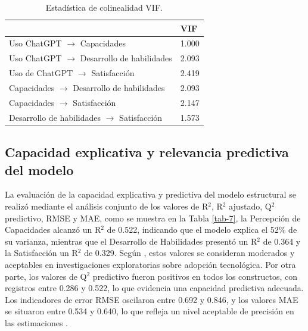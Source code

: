 \documentclass[spanish]{textolivre}
\begin{document}
\begin{table}[h!]
\centering
\begin{threeparttable}
\caption{Estadística de colinealidad VIF.}\label{tab-6}
\begin{tabular}{l l}
\toprule
 & VIF \\
\midrule
Uso ChatGPT $\rightarrow$ Capacidades & 1.000 \\
Uso ChatGPT $\rightarrow$ Desarrollo de habilidades & 2.093 \\
Uso de ChatGPT $\rightarrow$ Satisfacción & 2.419 \\
Capacidades $\rightarrow$ Desarrollo de habilidades & 2.093 \\
Capacidades $\rightarrow$ Satisfacción & 2.147 \\
Desarrollo de habilidades $\rightarrow$ Satisfacción & 1.573 \\
\bottomrule
\end{tabular}
\end{threeparttable}
\end{table}

\subsection{Capacidad explicativa y relevancia predictiva del modelo}
La evaluación de la capacidad explicativa y predictiva del modelo estructural se realizó mediante el análisis conjunto de los valores de R$^2$, R$^2$ ajustado, Q$^2$ predictivo, RMSE y MAE, como se muestra en la Tabla \ref{tab-7}, la Percepción de Capacidades alcanzó un R$^2$ de 0.522, indicando que el modelo explica el 52\% de su varianza, mientras que el Desarrollo de Habilidades presentó un R$^2$ de 0.364 y la Satisfacción un R$^2$ de 0.329. Según \textcite{liengaard2021}, estos valores se consideran moderados y aceptables en investigaciones exploratorias sobre adopción tecnológica. Por otra parte, los valores de Q$^2$ predictivo fueron positivos en todos los constructos, con registros entre 0.286 y 0.522, lo que evidencia una capacidad predictiva adecuada. Los indicadores de error RMSE oscilaron entre 0.692 y 0.846, y los valores MAE se situaron entre 0.534 y 0.640, lo que refleja un nivel aceptable de precisión en las estimaciones \cite{hair2022}.
\end{document}
